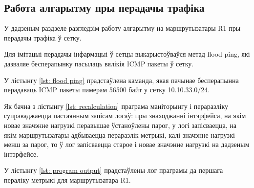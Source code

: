 

\subsection{Работа алгарытму пры перадачы трафіка}

У дадзеным раздзеле разгледзім работу алгарытму на маршрутызатары R1 пры
перадачы трафіка ў сетку.

Для імітацыі перадачы інфармацыі ў сетцы выкарыстоўваўся метад flood ping,
які дазваляе бесперапынку пасылаць вялікія ICMP пакеты ў сетку.

У лістынгу \ref{lst: flood ping} прадстаўлена каманда, якая пачынае 
бесперапынна перадаваць ICMP пакеты памерам 56500 байт у сетку 10.10.33.0/24.



Як бачна з лістынгу \ref{lst: recalculation} праграма маніторынгу і пераразліку суправаджаецца пастаянным
запісам логаў: пры знаходжанні інтэрфейса, на якім новае значэнне нагрузкі перавышае ўстаноўлены парог,
у логі запісваецца, на якім маршрутызатары адбываецца пераразлік метрыкі, калі значэнне нагрузкі менш за парог,
то ў лог запісваецца старое і новае значэнне нагрузкі на дадзеным інтэрфейсе.

У лістынгу \ref{lst: program output} прадстаўлены лог праграмы да першага пераліку метрыкі для маршрутызатара R1.


